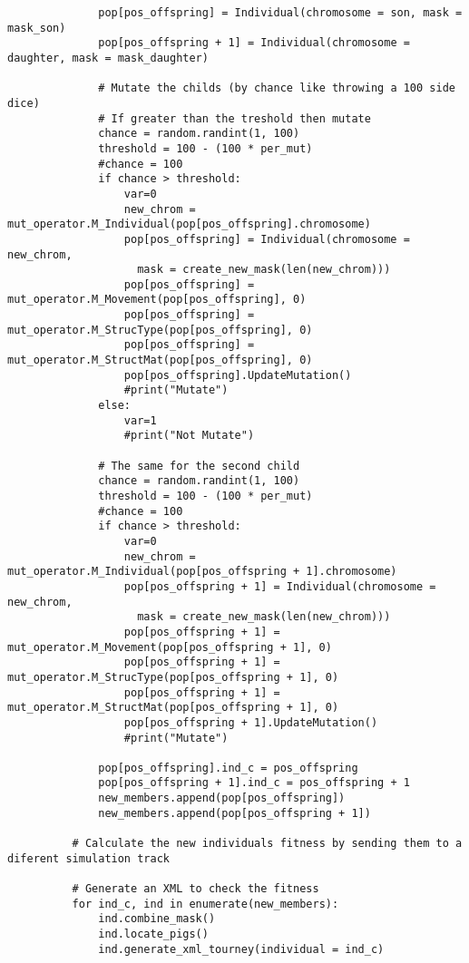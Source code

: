 \begin{verbatim}
              pop[pos_offspring] = Individual(chromosome = son, mask = mask_son)
              pop[pos_offspring + 1] = Individual(chromosome = daughter, mask = mask_daughter)

              # Mutate the childs (by chance like throwing a 100 side dice)
              # If greater than the treshold then mutate
              chance = random.randint(1, 100)
              threshold = 100 - (100 * per_mut)
              #chance = 100
              if chance > threshold:
                  var=0
                  new_chrom = mut_operator.M_Individual(pop[pos_offspring].chromosome)
                  pop[pos_offspring] = Individual(chromosome = new_chrom, 
                    mask = create_new_mask(len(new_chrom)))
                  pop[pos_offspring] = mut_operator.M_Movement(pop[pos_offspring], 0)
                  pop[pos_offspring] = mut_operator.M_StrucType(pop[pos_offspring], 0)
                  pop[pos_offspring] = mut_operator.M_StructMat(pop[pos_offspring], 0)
                  pop[pos_offspring].UpdateMutation()
                  #print("Mutate")
              else:
                  var=1
                  #print("Not Mutate")
              
              # The same for the second child
              chance = random.randint(1, 100)
              threshold = 100 - (100 * per_mut)
              #chance = 100
              if chance > threshold:
                  var=0
                  new_chrom = mut_operator.M_Individual(pop[pos_offspring + 1].chromosome)
                  pop[pos_offspring + 1] = Individual(chromosome = new_chrom, 
                    mask = create_new_mask(len(new_chrom)))
                  pop[pos_offspring + 1] = mut_operator.M_Movement(pop[pos_offspring + 1], 0)
                  pop[pos_offspring + 1] = mut_operator.M_StrucType(pop[pos_offspring + 1], 0)
                  pop[pos_offspring + 1] = mut_operator.M_StructMat(pop[pos_offspring + 1], 0)
                  pop[pos_offspring + 1].UpdateMutation()
                  #print("Mutate")
              
              pop[pos_offspring].ind_c = pos_offspring
              pop[pos_offspring + 1].ind_c = pos_offspring + 1
              new_members.append(pop[pos_offspring])
              new_members.append(pop[pos_offspring + 1])
          
          # Calculate the new individuals fitness by sending them to a diferent simulation track
          
          # Generate an XML to check the fitness
          for ind_c, ind in enumerate(new_members):
              ind.combine_mask()
              ind.locate_pigs()
              ind.generate_xml_tourney(individual = ind_c)
          

\end{verbatim}
